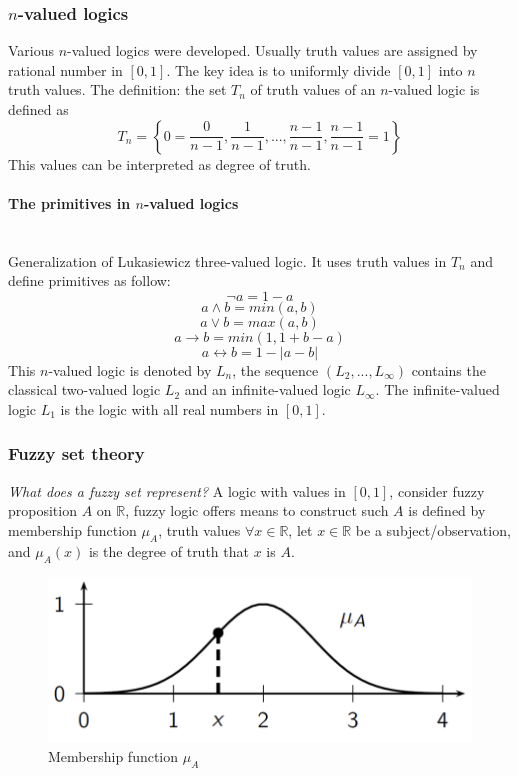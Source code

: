 \documentclass{article}
\begin{document}
\subsubsection{$n$-valued logics}
Various $n$-valued logics were developed. Usually truth values are assigned by rational number in
$[0,1]$. The key idea is to uniformly divide $[0,1]$ into $n$ truth values.
\newline\newline
The definition: the set $T_n$ of truth values of an $n$-valued logic is defined as
$$T_n=\left\{0=\frac{0}{n-1},\frac{1}{n-1},...,\frac{n-1}{n-1},\frac{n-1}{n-1}=1\right\}$$
This values can be interpreted as degree of truth.
\paragraph{The primitives in $n$-valued logics}\mbox{}\\
Generalization of Lukasiewicz three-valued logic. It uses truth values in $T_n$ and define primitives as follow:
$$\lnot a = 1-a$$
$$a\land b =min(a,b)$$
$$a\lor b =max(a,b)$$
$$a\rightarrow b = min(1,1+b-a)$$
$$a\longleftrightarrow b= 1-|a-b|$$
This $n$-valued logic is denoted by $L_n$, the sequence $(L_2,...,L_\infty)$ contains the
classical two-valued logic $L_2$ and an infinite-valued logic $L_\infty$. The infinite-valued
logic $L_1$ is the logic with all real numbers in $[0,1]$.

\subsubsection{Fuzzy set theory}
\textit{What does a fuzzy set represent?} A logic with values in $[0,1]$, consider fuzzy
proposition $A$ on $\mathbb{R}$, fuzzy logic offers means to construct such
$A$ is defined by membership function $\mu_A$, truth values $\forall x \in\mathbb{R}$, let
$x\in\mathbb{R}$ be a subject/observation, and $\mu_A(x)$ is the degree of truth that $x$
is $A$.
\begin{figure}[H]
    \centering
    \includegraphics[scale=0.5]{images/membership-func-fuzzy.png}
    \caption{Membership function $\mu_A$}
\end{figure}
\end{document}
